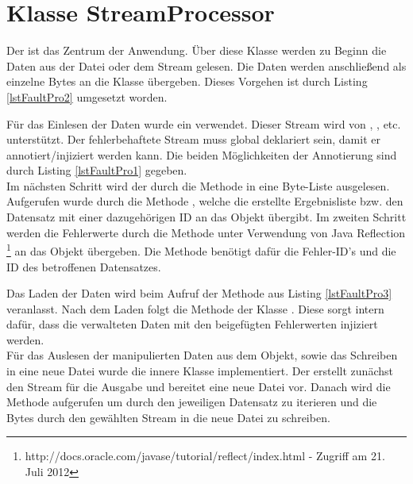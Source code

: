 \section{Klasse StreamProcessor}
Der  ist das Zentrum der Anwendung. Über diese Klasse werden zu Beginn die Daten aus der Datei oder dem Stream gelesen. Die Daten werden anschlie\ss end als einzelne Bytes an die Klasse  übergeben. Dieses Vorgehen ist durch Listing \ref{lstFaultPro2} umgesetzt worden.
\begin{figure}[!htb]
	
\end{figure}
F\"ur das Einlesen der Daten wurde ein  verwendet. Dieser Stream wird von , , etc. unterstützt. Der fehlerbehaftete Stream muss global deklariert sein, damit er annotiert/injiziert werden kann. Die beiden M\"oglichkeiten der Annotierung sind durch Listing \ref{lstFaultPro1} gegeben.\\
Im n\"achsten Schritt wird der  durch die Methode  in eine Byte-Liste ausgelesen. Aufgerufen wurde  durch die Methode , welche die erstellte Ergebnisliste bzw. den Datensatz mit einer dazugehörigen ID an das  Objekt übergibt. Im zweiten Schritt werden die Fehlerwerte durch die Methode  unter Verwendung von Java Reflection \footnote{http://docs.oracle.com/javase/tutorial/reflect/index.html - Zugriff am 21. Juli 2012
} an das  Objekt übergeben. Die Methode benötigt dafür die Fehler-ID's und die ID des betroffenen Datensatzes.
\begin{figure}[!htb]
	
\end{figure}
Das Laden der Daten wird beim Aufruf der Methode  aus Listing \ref{lstFaultPro3} veranlasst. Nach dem Laden folgt die Methode  der Klasse . Diese sorgt intern daf\"ur, dass die verwalteten Daten mit den beigef\"ugten Fehlerwerten injiziert werden.\\
F\"ur das Auslesen der manipulierten Daten aus dem  Objekt, sowie das Schreiben in eine neue Datei wurde die innere Klasse  implementiert. Der  erstellt zun\"achst den Stream für die Ausgabe und bereitet eine neue Datei vor. Danach wird die Methode  aufgerufen um durch den jeweiligen Datensatz zu iterieren und die Bytes durch den gewählten Stream in die neue Datei zu schreiben.
